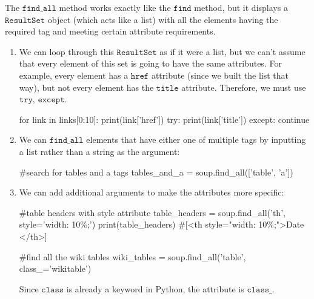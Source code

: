 \documentclass{article}
\begin{document}
  \begin{definition}
  The $\texttt{find\_all}$ method works exactly like the $\texttt{find}$ method, but it displays a $\texttt{ResultSet}$ object (which acts like a list) with all the elements having the required tag and meeting certain attribute requirements. 
  \begin{enumerate}
      \item We can loop through this $\texttt{ResultSet}$ as if it were a list, but we can't assume that every element of this set is going to have the same attributes. For example, every element has a $\texttt{href}$ attribute (since we built the list that way), but not every element has the $\texttt{title}$ attribute. Therefore, we must use $\texttt{try, except}$. 
      \begin{python}
      for link in links[0:10]:
          print(link['href'])
          try: 
              print(link['title'])
          except:
              continue
      \end{python}
      
      \item We can $\texttt{find\_all}$ elements that have either one of multiple tags by inputting a list rather than a string as the argument: 
      \begin{python}
      #search for tables and a tags
      tables_and_a = soup.find_all(['table', 'a'])
      \end{python}
      
      \item We can add additional arguments to make the attributes more specific: 
      \begin{python}
      #table headers with style attribute
      table_headers = soup.find_all('th', style='width: 10\%;')
      print(table_headers)
      #[<th style="width: 10\%;">Date </th>]
      
      #find all the wiki tables
      wiki_tables = soup.find_all('table', class_='wikitable')
      \end{python}
      Since $\texttt{class}$ is already a keyword in Python, the attribute is $\texttt{class\_}$. 
      

\end{enumerate}
\end{definition}
\end{document}
